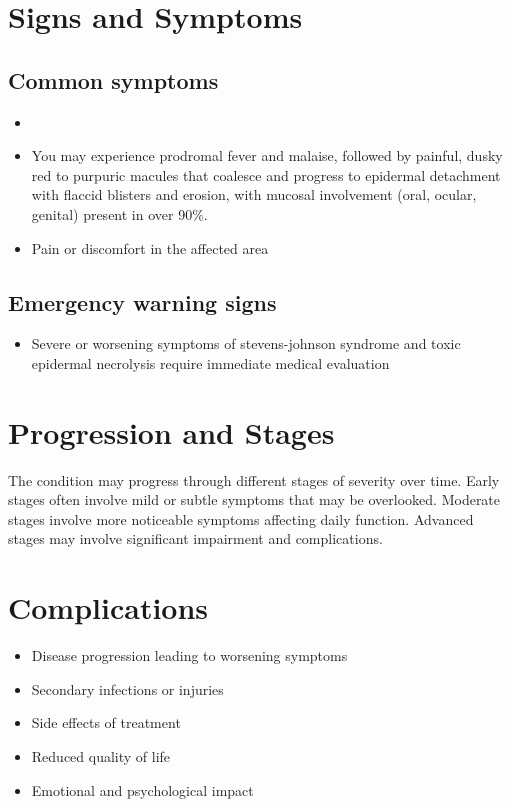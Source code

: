 \section{Signs and Symptoms}

\subsection{Common symptoms}
\begin{itemize}[noitemsep]
  \item \item You may experience prodromal fever and malaise, followed by painful, dusky red to purpuric macules that coalesce and progress to epidermal detachment with flaccid blisters and erosion, with mucosal involvement (oral, ocular, genital) present in over 90\%.

  \item Pain or discomfort in the affected area
  \end{itemize}

\subsection{Emergency warning signs}
\begin{itemize}[noitemsep]
  \item Severe or worsening symptoms of stevens-johnson syndrome and toxic epidermal necrolysis require immediate medical evaluation
\end{itemize}
\section{Progression and Stages}
The condition may progress through different stages of severity over time. Early stages often involve mild or subtle symptoms that may be overlooked. Moderate stages involve more noticeable symptoms affecting daily function. Advanced stages may involve significant impairment and complications.
\section{Complications}
\begin{itemize}[noitemsep]
  \item Disease progression leading to worsening symptoms
  \item Secondary infections or injuries
  \item Side effects of treatment
  \item Reduced quality of life
  \item Emotional and psychological impact
\end{itemize}
